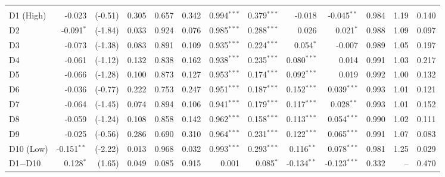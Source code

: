 {\begin{longtable}[t]{lrrrrrrrrrrrr}
\addlinespace[0.3em]
\hline
\multicolumn{13}{l}{\textit{Panel B: Full sample, raw-alpha ranking (robustness)}}\\
\hspace{1em}D1 (High) & -0.023 & (-0.51) & 0.305 & 0.657 & 0.342 & 0.994$^{***}$ & 0.379$^{***}$ & -0.018 & -0.045$^{**}$ & 0.984 & 1.19 & 0.140\\
\hspace{1em}D2 & -0.091$^{*}$ & (-1.84) & 0.033 & 0.924 & 0.076 & 0.985$^{***}$ & 0.288$^{***}$ & 0.026 & 0.021$^{*}$ & 0.988 & 1.09 & 0.097\\
\hspace{1em}D3 & -0.073 & (-1.38) & 0.083 & 0.891 & 0.109 & 0.935$^{***}$ & 0.224$^{***}$ & 0.054$^{*}$ & -0.007 & 0.989 & 1.05 & 0.197\\
\hspace{1em}D4 & -0.061 & (-1.12) & 0.132 & 0.838 & 0.162 & 0.938$^{***}$ & 0.235$^{***}$ & 0.080$^{***}$ & 0.014 & 0.991 & 1.03 & 0.217\\
\hspace{1em}D5 & -0.066 & (-1.28) & 0.100 & 0.873 & 0.127 & 0.953$^{***}$ & 0.174$^{***}$ & 0.092$^{***}$ & 0.019 & 0.992 & 1.00 & 0.132\\
\hspace{1em}D6 & -0.036 & (-0.77) & 0.222 & 0.753 & 0.247 & 0.951$^{***}$ & 0.187$^{***}$ & 0.152$^{***}$ & 0.039$^{***}$ & 0.993 & 1.01 & 0.121\\
\hspace{1em}D7 & -0.064 & (-1.45) & 0.074 & 0.894 & 0.106 & 0.941$^{***}$ & 0.179$^{***}$ & 0.117$^{***}$ & 0.028$^{**}$ & 0.993 & 1.01 & 0.152\\
\hspace{1em}D8 & -0.059 & (-1.24) & 0.108 & 0.858 & 0.142 & 0.962$^{***}$ & 0.158$^{***}$ & 0.113$^{***}$ & 0.054$^{***}$ & 0.990 & 1.02 & 0.111\\
\hspace{1em}D9 & -0.025 & (-0.56) & 0.286 & 0.690 & 0.310 & 0.964$^{***}$ & 0.231$^{***}$ & 0.122$^{***}$ & 0.065$^{***}$ & 0.991 & 1.07 & 0.083\\
\hspace{1em}D10 (Low) & -0.151$^{**}$ & (-2.22) & 0.013 & 0.968 & 0.032 & 0.993$^{***}$ & 0.293$^{***}$ & 0.116$^{**}$ & 0.078$^{***}$ & 0.981 & 1.25 & 0.029\\
\hspace{1em}D1$-$D10 & 0.128$^{*}$ & (1.65) & 0.049 & 0.085 & 0.915 & 0.001 & 0.085$^{*}$ & -0.134$^{**}$ & -0.123$^{***}$ & 0.332 & -- & 0.470\\

\end{longtable}}
